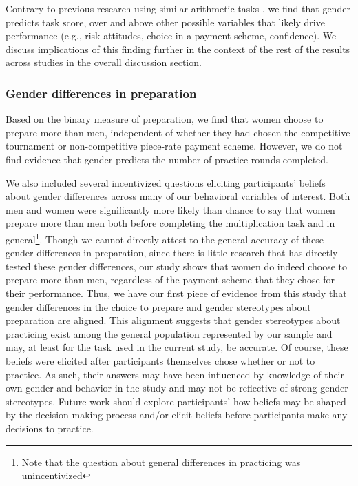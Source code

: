 \documentclass[a4paper, nobind]{templates/ociamthesis}
\begin{document}
Contrary to previous research using similar arithmetic tasks \autocite[see review in][]{Niederle2011}, we find that gender predicts task score, over and above other possible variables that likely drive performance (e.g., risk attitudes, choice in a payment scheme, confidence). We discuss implications of this finding further in the context of the rest of the results across studies in the overall discussion section.

\hypertarget{gender-differences-in-preparation-1}{%
\subsubsection{Gender differences in preparation}\label{gender-differences-in-preparation-1}}

Based on the binary measure of preparation, we find that women choose to prepare more than men, independent of whether they had chosen the competitive tournament or non-competitive piece-rate payment scheme. However, we do not find evidence that gender predicts the number of practice rounds completed.

We also included several incentivized questions eliciting participants' beliefs about gender differences across many of our behavioral variables of interest. Both men and women were significantly more likely than chance to say that women prepare more than men both before completing the multiplication task and in general\footnote{Note that the question about general differences in practicing was unincentivized}. Though we cannot directly attest to the general accuracy of these gender differences in preparation, since there is little research that has directly tested these gender differences, our study shows that women do indeed choose to prepare more than men, regardless of the payment scheme that they chose for their performance. Thus, we have our first piece of evidence from this study that gender differences in the choice to prepare and gender stereotypes about preparation are aligned. This alignment suggests that gender stereotypes about practicing exist among the general population represented by our sample and may, at least for the task used in the current study, be accurate. Of course, these beliefs were elicited after participants themselves chose whether or not to practice. As such, their answers may have been influenced by knowledge of their own gender and behavior in the study and may not be reflective of strong gender stereotypes. Future work should explore participants' how beliefs may be shaped by the decision making-process and/or elicit beliefs before participants make any decisions to practice.
\end{document}
